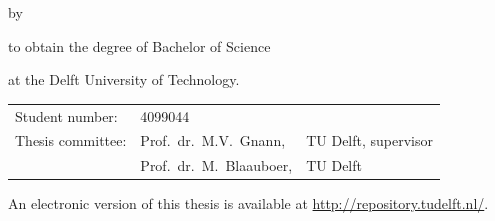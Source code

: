 \begin{titlepage}


\begin{center}


{\makeatletter
\largetitlestyle\Huge\selectfont\@title
\makeatother}

{\makeatletter
\ifx\@subtitle\undefined\else
    \bigskip
    \titlefont\titleshape\LARGE\@subtitle
\fi
\makeatother}

\bigskip
\bigskip

by

\bigskip
\bigskip

{\makeatletter
\largetitlefont\Large\selectfont\@author
\makeatother}

\bigskip
\bigskip

to obtain the degree of Bachelor of Science

at the Delft University of Technology.


\vfill

\begin{tabular}{lll}
    Student number: & 4099044 \\
    Thesis committee: & Prof.\ dr.\  M.V.\ Gnann, & TU Delft, supervisor \\
        & Prof.\ dr.\ M.\ Blaauboer, & TU Delft \\
\end{tabular}


\bigskip
\bigskip
An electronic version of this thesis is available at \url{http://repository.tudelft.nl/}.


\end{center}
\end{titlepage}
